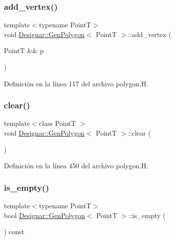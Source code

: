 \subsubsection{\texorpdfstring{add\+\_\+vertex()}{add\_vertex()}\hspace{0.1cm}{\footnotesize\ttfamily [2/2]}}
{\footnotesize\ttfamily template$<$typename PointT$>$ \\
void \hyperlink{class_designar_1_1_gen_polygon}{Designar\+::\+Gen\+Polygon}$<$ PointT $>$\+::add\+\_\+vertex (\begin{DoxyParamCaption}\item[{PointT \&\&}]{p }\end{DoxyParamCaption})\hspace{0.3cm}{\ttfamily [inline]}}



Definición en la línea 117 del archivo polygon.\+H.

\mbox{\label{class_designar_1_1_gen_polygon_a1f16b49e951787ee8afff43ae1957a8b}} 
\subsubsection{\texorpdfstring{clear()}{clear()}}
{\footnotesize\ttfamily template$<$class PointT $>$ \\
void \hyperlink{class_designar_1_1_gen_polygon}{Designar\+::\+Gen\+Polygon}$<$ PointT $>$\+::clear (\begin{DoxyParamCaption}{ }\end{DoxyParamCaption})}



Definición en la línea 450 del archivo polygon.\+H.

\mbox{\label{class_designar_1_1_gen_polygon_a71494c73881d1281048a24d4d75b67f1}} 
\subsubsection{\texorpdfstring{is\+\_\+empty()}{is\_empty()}}
{\footnotesize\ttfamily template$<$typename PointT$>$ \\
bool \hyperlink{class_designar_1_1_gen_polygon}{Designar\+::\+Gen\+Polygon}$<$ PointT $>$\+::is\+\_\+empty (\begin{DoxyParamCaption}{ }\end{DoxyParamCaption}) const\hspace{0.3cm}{\ttfamily [inline]}}



